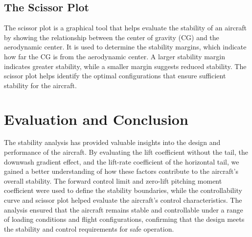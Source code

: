\documentclass[12pt]{report}
\begin{document}
\section{The Scissor Plot}

The scissor plot is a graphical tool that helps evaluate the stability of an aircraft by showing the relationship between the center of gravity (CG) and the aerodynamic center. It is used to determine the stability margins, which indicate how far the CG is from the aerodynamic center. A larger stability margin indicates greater stability, while a smaller margin suggests reduced stability. The scissor plot helps identify the optimal configurations that ensure sufficient stability for the aircraft.

\chapter{Evaluation and Conclusion}

The stability analysis has provided valuable insights into the design and performance of the aircraft. By evaluating the lift coefficient without the tail, the downwash gradient effect, and the lift-rate coefficient of the horizontal tail, we gained a better understanding of how these factors contribute to the aircraft's overall stability. The forward control limit and zero-lift pitching moment coefficient were used to define the stability boundaries, while the controllability curve and scissor plot helped evaluate the aircraft's control characteristics. The analysis ensured that the aircraft remains stable and controllable under a range of loading conditions and flight configurations, confirming that the design meets the stability and control requirements for safe operation.
\end{document}
